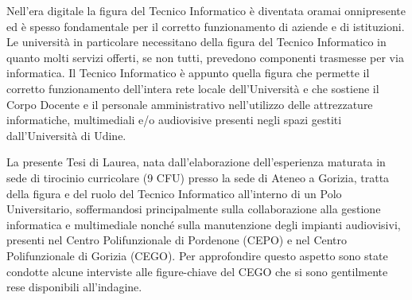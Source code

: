 \introduction\label{ch:intro}
        Nell'era digitale la figura del Tecnico Informatico è diventata oramai onnipresente ed è spesso fondamentale per il corretto funzionamento di aziende e di istituzioni. Le università in particolare necessitano della figura del Tecnico Informatico in quanto molti servizi offerti, se non tutti, prevedono componenti trasmesse per via informatica. \newline
        Il Tecnico Informatico è appunto quella figura che permette il corretto funzionamento dell'intera rete locale dell'Università e che sostiene il Corpo Docente e il personale amministrativo nell'utilizzo delle attrezzature informatiche, multimediali e/o audiovisive presenti negli spazi gestiti dall'Università di Udine.
    \par
        La presente Tesi di Laurea, nata dall'elaborazione dell'esperienza maturata in sede di tirocinio curricolare (9 CFU) presso la sede di Ateneo a Gorizia, tratta della figura e del ruolo del Tecnico Informatico all'interno di un Polo Universitario, soffermandosi principalmente sulla collaborazione alla gestione informatica e multimediale nonché sulla manutenzione degli impianti audiovisivi, presenti nel Centro Polifunzionale di Pordenone (CEPO) e nel Centro Polifunzionale di Gorizia (CEGO). \newline
        Per approfondire questo aspetto sono state condotte alcune interviste alle figure-chiave del CEGO che si sono gentilmente rese disponibili all'indagine. 
